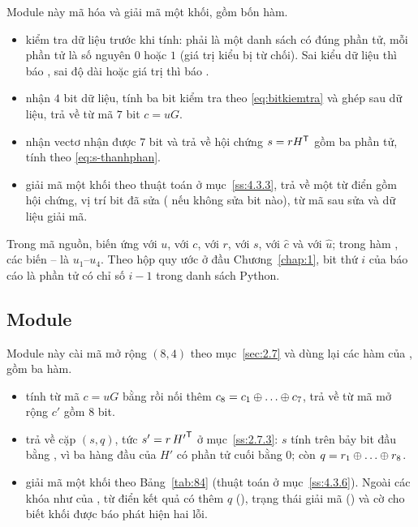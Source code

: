 Module này mã hóa và giải mã một khối, gồm bốn hàm.
\begin{itemize}
  \item {} kiểm tra dữ liệu trước
        khi tính:  phải là một danh sách có đúng
         phần tử, mỗi phần tử là số nguyên $0$ hoặc $1$
        (giá trị kiểu  bị từ chối). Sai kiểu dữ liệu thì báo
        , sai độ dài hoặc giá trị thì báo .
  \item {} nhận $4$ bit dữ liệu, tính ba bit kiểm tra
        theo \eqref{eq:bitkiemtra} và ghép sau dữ liệu, trả về từ mã $7$ bit
        $c = uG$.
  \item {} nhận vectơ nhận được $7$ bit và
        trả về hội chứng ${s = rH^{\mathsf{T}}}$ gồm ba phần tử, tính theo
        \eqref{eq:s-thanhphan}.
  \item {} giải mã một khối theo thuật toán ở
        mục~\ref{ss:4.3.3}, trả về một từ điển gồm hội chứng, vị trí bit đã sửa
        ( nếu không sửa bit nào), từ mã sau sửa và dữ liệu giải mã.
\end{itemize}

Trong mã nguồn, biến  ứng với $u$,  với $c$,
 với $r$,  với $s$,  với
$\hat{c}$ và  với $\hat{u}$; trong hàm ,
các biến -- là $u_1$--$u_4$. Theo hộp quy ước
ở đầu Chương~\ref{chap:1}, bit thứ $i$ của báo cáo là phần tử có chỉ số $i - 1$
trong danh sách Python.

\subsection{Module }
\label{ss:4.2.2}

Module này cài mã mở rộng $(8,4)$ theo mục~\ref{sec:2.7} và dùng lại các hàm của
, gồm ba hàm.
\begin{itemize}
  \item {} tính từ mã $c = uG$ bằng
         rồi nối thêm $c_8 = c_1 \xor \dots \xor c_7$,
        trả về từ mã mở rộng $c'$ gồm $8$ bit.
  \item {} trả về cặp $(s, q)$, tức
        $s' = r\,{H'}^{\mathsf{T}}$ ở mục~\ref{ss:2.7.3}: $s$ tính trên bảy bit đầu bằng
        , vì ba hàng đầu của $H'$ có phần tử cuối
        bằng $0$; còn $q = r_1 \xor \dots \xor r_8$.
  \item {} giải mã một khối theo
        Bảng~\ref{tab:84} (thuật toán ở mục~\ref{ss:4.3.6}). Ngoài các khóa như
        của , từ điển kết quả có thêm $q$
        (), trạng thái giải mã () và cờ
         cho biết khối được báo phát hiện hai lỗi.
\end{itemize}

